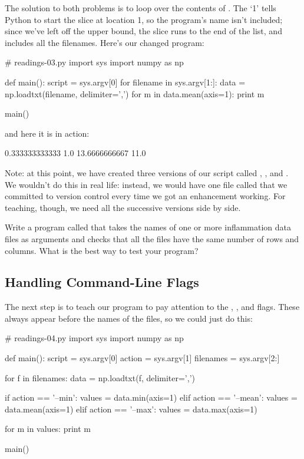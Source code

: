 The solution to both problems is to loop over the contents of
. The `1' tells Python to start the slice at
location 1, so the program's name isn't included; since we've left off
the upper bound, the slice runs to the end of the list, and includes all
the filenames. Here's our changed program:

\begin{VerbIn}
# readings-03.py
import sys
import numpy as np

def main():
    script = sys.argv[0]
    for filename in sys.argv[1:]:
        data = np.loadtxt(filename, delimiter=',')
        for m in data.mean(axis=1):
            print m

main()
\end{VerbIn}

and here it is in action:


\begin{VerbOut}
0.333333333333
1.0
13.6666666667
11.0
\end{VerbOut}

Note: at this point, we have created three versions of our script called
, , and
. We wouldn't do this in real life: instead, we
would have one file called  that we committed to
version control every time we got an enhancement working. For teaching,
though, we need all the successive versions side by side.

\begin{challenge}
  Write a program called  that takes the names of one
  or more inflammation data files as arguments and checks that all the
  files have the same number of rows and columns. What is the best way
  to test your program?
\end{challenge}

\subsection{Handling Command-Line Flags}

The next step is to teach our program to pay attention to the
, , and  flags. These
always appear before the names of the files, so we could just do this:

\begin{VerbIn}
# readings-04.py
import sys
import numpy as np

def main():
    script = sys.argv[0]
    action = sys.argv[1]
    filenames = sys.argv[2:]

    for f in filenames:
        data = np.loadtxt(f, delimiter=',')

        if action == '--min':
            values = data.min(axis=1)
        elif action == '--mean':
            values = data.mean(axis=1)
        elif action == '--max':
            values = data.max(axis=1)

        for m in values:
            print m

main()
\end{VerbIn}

